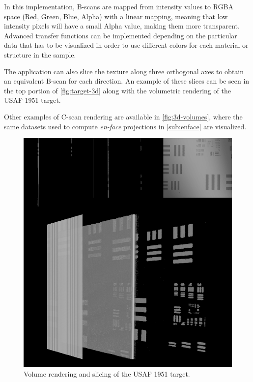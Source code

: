 In this implementation, B-scans are mapped from intensity values to RGBA space (Red, Green, Blue, Alpha) with a linear mapping, meaning that low intensity pixels will have a small Alpha value, making them more transparent. Advanced transfer functions can be implemented depending on the particular data that has to be visualized in order to use different colors for each material or structure in the sample. 

The application can also slice the texture along three orthogonal axes to obtain an equivalent B-scan for each direction. An example of these slices can be seen in the top portion of \autoref{fig:target-3d} along with the volumetric rendering of the USAF 1951 target. 

Other examples of C-scan rendering are available in \autoref{fig:3d-volumes}, where the same datasets used to compute \emph{en-face} projections in \autoref{sub:enface} are visualized. 

	\begin{figure}[hbt]
		\centering
		\includegraphics[width=0.92\linewidth,height=0.8\linewidth]{gfx/3d/target}
		\caption[]{Volume rendering and slicing of the USAF 1951 target.}\label{fig:target-3d}
	\end{figure}
%
%
%
%
%
%

